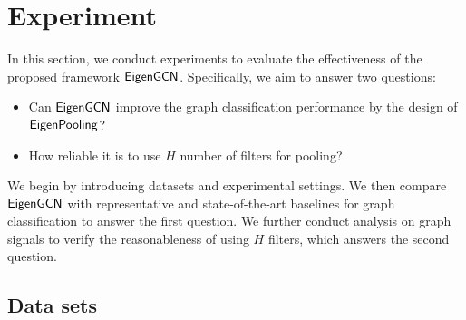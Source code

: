\documentclass[sigconf]{acmart}
\newcommand{\m}{{\sf {EigenGCN}}}
\newcommand{\pooling}{{\sf {EigenPooling}}}
\begin{document}
 \section{Experiment} \label{sec:experimental_results}
In this section, we conduct experiments to evaluate the effectiveness of the proposed framework $\m$. Specifically, we aim to answer two questions:
\begin{itemize}
    \item Can $\m$ improve the graph classification performance by the design of $\pooling$?
    \item How reliable it is to use $H$ number of filters for pooling?
\end{itemize}
We begin by introducing datasets and experimental settings. We then compare $\m$ with representative and state-of-the-art baselines for graph classification to answer the first question. We further conduct analysis on graph signals to verify the reasonableness of using $H$ filters, which answers the second question. 



\subsection{Data sets}
\end{document}
